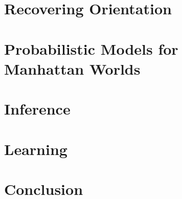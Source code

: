 \documentclass[a4paper,11pt]{report}
\begin{document}
%
\def\localpath{RecoveringOrientation}
\graphicspath{{\localpath/figures/}}
\chapter{Recovering Orientation}
\label{chap:orientation}


%
\def\localpath{Models}
\graphicspath{{\localpath/figures/}}
\chapter{Probabilistic Models for Manhattan Worlds}
\label{chap:models}


%
\def\localpath{Inference}
\graphicspath{{\localpath/figures/}}
\chapter{Inference}
\label{chap:inference}


%
\def\localpath{Learning}
\graphicspath{{\localpath/figures/}}
\chapter{Learning}
\label{chap:learning}


%
\def\localpath{Conclusion}
\graphicspath{{\localpath/figures/}}
\chapter{Conclusion}
\label{chap:conclusion}

\end{document}
